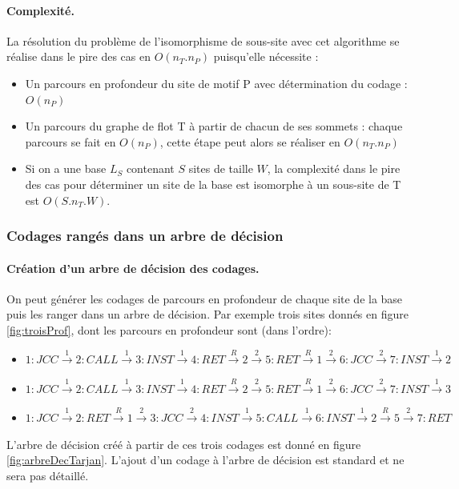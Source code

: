 \paragraph{Complexité.}
La résolution du problème de l'isomorphisme de sous-site avec cet algorithme se réalise dans le pire des cas en $O(n_T.n_P)$ puisqu'elle nécessite :
\begin{itemize}
 \item Un parcours en profondeur du site de motif P avec détermination du codage : $O(n_P)$
 \item Un parcours du graphe de flot T à partir de chacun de ses sommets : chaque parcours se fait en $O(n_P)$, cette étape peut alors se réaliser en $O(n_T.n_P)$
 \item Si on a une base $L_S$ contenant $S$ sites de taille $W$, la complexité dans le pire des cas pour déterminer un site de la base est isomorphe à un sous-site de T est $O(S.n_T.W)$.
\end{itemize}

\subsubsection{Codages rangés dans un arbre de décision}
\paragraph{Création d'un arbre de décision des codages.}
On peut générer les codages de parcours en profondeur de chaque site de la base puis les ranger dans un arbre de décision. Par exemple trois sites donnés en figure \ref{fig:troisProf}, dont les parcours en profondeur sont (dans l'ordre):
\begin{itemize}
 \item $1: JCC\xrightarrow{1} 2: CALL \xrightarrow{1} 3: INST \xrightarrow{1} 4: RET \xrightarrow{R} 2 \xrightarrow{2} 5: RET \xrightarrow{R} 1 \xrightarrow{2} 6: JCC \xrightarrow{2} 7:INST \xrightarrow{1} 2$
 \item $1: JCC\xrightarrow{1} 2: CALL \xrightarrow{1} 3: INST \xrightarrow{1} 4: RET \xrightarrow{R} 2 \xrightarrow{2} 5: RET \xrightarrow{R} 1 \xrightarrow{2} 6: JCC \xrightarrow{2} 7:INST \xrightarrow{1} 3$
 \item $1: JCC\xrightarrow{1} 2: RET \xrightarrow{R} 1 \xrightarrow{2} 3: JCC \xrightarrow{2} 4: INST \xrightarrow{1} 5: CALL \xrightarrow{1} 6: INST \xrightarrow{1} 2 \xrightarrow{R} 5 \xrightarrow{2} 7: RET$
\end{itemize}
L'arbre de décision créé à partir de ces trois codages est donné en figure \ref{fig:arbreDecTarjan}. L'ajout d'un codage à l'arbre de décision est standard et ne sera pas détaillé.

